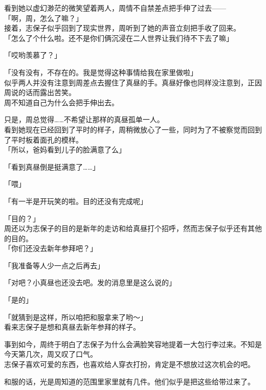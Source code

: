 看到她以虚幻渺茫的微笑望着两人，周情不自禁差点把手伸了过去——\\

「啊，周，怎么了嘛？」\\

接着，志保子似乎回到了现实世界，周听到了她的声音立刻把手收了回来。\\

「怎么了个什么啦。还不是你们俩沉浸在二人世界让我们待不下去了嘛」

「哎哟羡慕了？」

「没有没有，不存在的。我是觉得这种事情给我在家里做啦」\\

似乎两人并没有注意到周差点去握住了真昼的手。真昼好像也同样没注意到，正因周说的话而露出苦笑。\\

周不知道自己为什么会把手伸出去。

只是，周总觉得……不希望让那样的真昼孤单一人。\\

看到她现在已经回到了平时的样子，周稍微放心了一些，同时为了不被察觉而回到了平时板着面孔的模样。\\

「所以，爸妈看到儿子的脸满意了么」

「看到真昼倒是挺满意了……」

「喂」

「有一半是开玩笑的啦。目的还没有完成呢」

「目的？」\\

周还以为志保子的目的是新年的走访和给真昼打个招呼，然而志保子似乎还有其他的目的。\\

「你们还没去新年参拜吧？」

「我准备等人少一点之后再去」

「对吧？小真昼也还没去吧。发的消息里是这么说的」

「是的」

「就猜到是这样，所以咱把和服拿来了哟～」\\

看来志保子是想和真昼去新年参拜的样子。

事到如今，周终于明白了志保子为什么会满脸笑容地提着一大包行李过来。不知是今天第几次，周又叹了口气。\\

志保子喜欢可爱的东西，也喜欢给人穿衣打扮，肯定是不想放过这次机会的吧。

和服的话，光是周知道的范围里家里就有几件。他们似乎是把这些给带过来了。\\


